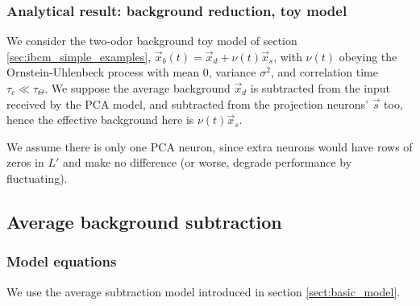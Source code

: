 \subsubsection{Analytical result: background reduction, toy model}
\label{subsec:pca_toy}
We consider the two-odor background toy model of section \ref{sec:ibcm_simple_examples}, $\vec{x}_b(t) = \vec{x}_d + \nu(t) \vec{x}_s$, with $\nu(t)$ obeying the Ornstein-Uhlenbeck process with mean $0$, variance $\sigma^2$, and correlation time $\tau_c \ll \tau_{\Theta}$. We suppose the average background $\vec{x}_d$ is subtracted from the input received by the PCA model, and subtracted from the projection neurons' $\vec{s}$ too, hence the effective background here is $\nu(t) \vec{x}_s$. 

We assume there is only one PCA neuron, since extra neurons would have rows of zeros in $L'$ and make no difference (or worse, degrade performance by fluctuating). 







\subsection{Average background subtraction}
\subsubsection{Model equations}

We use the average subtraction model introduced in section \ref{sect:basic_model}. 



